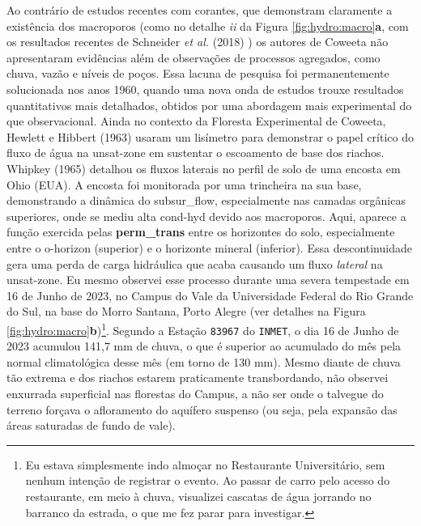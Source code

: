 \documentclass[./main.tex]{subfiles}
\begin{document}
\par Ao contrário de estudos recentes com corantes, que demonstram claramente a existência dos macroporos (como no detalhe \textit{ii} da Figura \ref{fig:hydro:macro}\textbf{a}, com os resultados recentes de Schneider \textit{et al.} (2018) \cite{Schneider2018}) os autores de Coweeta não apresentaram evidências além de observações de processos agregados, como chuva, vazão e níveis de poços. Essa lacuna de pesquisa foi permanentemente solucionada nos anos 1960, quando uma nova onda de estudos trouxe resultados quantitativos mais detalhados, obtidos por uma abordagem mais experimental do que observacional. Ainda no contexto da Floresta Experimental de Coweeta, Hewlett e Hibbert (1963) \cite{Hewlett1963} usaram um lisímetro para demonstrar o papel crítico do fluxo de água na \gls{unsat-zone} em sustentar o escoamento de base dos riachos. Whipkey (1965) \cite{Whipkey1965} detalhou os fluxos laterais no perfil de solo de uma encosta em Ohio (EUA). A encosta foi monitorada por uma trincheira na sua base, demonstrando a dinâmica do \gls{subsur_flow}, especialmente nas camadas orgânicas superiores, onde se mediu alta \gls{cond-hyd} devido aos macroporos. Aqui, aparece a função exercida pelas \textbf{\gls{perm_trans}} entre os horizontes do solo, especialmente entre o \gls{o-horizon} (superior) e o horizonte mineral (inferior). Essa descontinuidade gera uma perda de carga hidráulica que acaba causando um fluxo \textit{lateral} na \gls{unsat-zone}. Eu mesmo observei esse processo durante uma severa tempestade em 16 de Junho de 2023, no Campus do Vale da Universidade Federal do Rio Grande do Sul, na base do Morro Santana, Porto Alegre (ver detalhes na Figura \ref{fig:hydro:macro}\textbf{b})\footnote{Eu estava simplesmente indo almoçar no Restaurante Universitário, sem nenhum intenção de registrar o evento. Ao passar de carro pelo acesso do restaurante, em meio à chuva, visualizei cascatas de água jorrando no barranco da estrada, o que me fez parar para investigar.}. Segundo a Estação \texttt{83967} do \texttt{INMET}, o dia 16 de Junho de 2023 acumulou 141,7 mm de chuva, o que é superior ao acumulado do mês pela normal climatológica desse mês (em torno de 130 mm). Mesmo diante de chuva tão extrema e dos riachos estarem praticamente transbordando, não observei enxurrada superficial nas florestas do Campus, a não ser onde o talvegue do terreno forçava o afloramento do aquífero suspenso (ou seja, pela expansão das áreas saturadas de fundo de vale).
\end{document}
